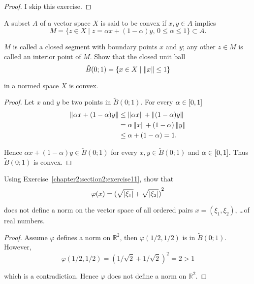 \begin{proof}
    I skip this exercise.
\end{proof}

\begin{exercise}\label{chapter2:section2:exercise11}
    A subset $A$ of a vector space $X$ is said to be convex if $x, y\in A$ implies
    \[
        M = \{ z\in X \mid z = \alpha x + (1 - \alpha)y,\, 0\leq \alpha\leq 1 \}\subset A.
    \]

    $M$ is called a closed segment with boundary points $x$ and $y$; any other $z\in M$ is called an interior point of $M$. Show that the closed unit ball
    \[
        \tilde{B}(0; 1) = \{ x\in X \mid \left\Vert{x}\right\Vert\leq 1 \}
    \]

    in a normed space $X$ is convex.
\end{exercise}

\begin{proof}
    Let $x$ and $y$ be two points in $\tilde{B}(0; 1)$. For every $\alpha\in \left[{0, 1}\right]$
    \begin{align*}
        \left\Vert{\alpha x + (1 - \alpha)y}\right\Vert & \leq \left\Vert{\alpha x}\right\Vert + \left\Vert{(1 - \alpha)y}\right\Vert \\
                                        & = \alpha\left\Vert{x}\right\Vert + (1 - \alpha)\left\Vert{y}\right\Vert \\
                                        & \leq \alpha + (1 - \alpha) = 1.
    \end{align*}

    Hence $\alpha x + (1 - \alpha)y\in \tilde{B}(0; 1)$ for every $x, y\in \tilde{B}(0; 1)$ and $\alpha\in\left[{0, 1}\right]$. Thus $\tilde{B}(0; 1)$ is convex.
\end{proof}

\begin{exercise}\label{chapter2:section2:exercise12}
    Using Exercise~\ref{chapter2:section2:exercise11}, show that
    \[
        \varphi(x) = {(\sqrt{\left\vert{\xi_{1}}\right\vert} + \sqrt{\left\vert{\xi_{2}}\right\vert})}^{2}
    \]

    does not define a norm on the vector space of all ordered pairs $x = (\xi_{1}, \xi_{2})$, \ldots of real numbers.
\end{exercise}

\begin{proof}
    Assume $\varphi$ defines a norm on $\mathbb{R}^{2}$, then $\varphi(1/2, 1/2)$ is in $\tilde{B}(0; 1)$. However,
    \[
        \varphi(1/2, 1/2) = {\left(1/\sqrt{2} + 1/\sqrt{2}\right)}^{2} = 2 > 1
    \]

    which is a contradiction. Hence $\varphi$ does not define a norm on $\mathbb{R}^{2}$.
\end{proof}

